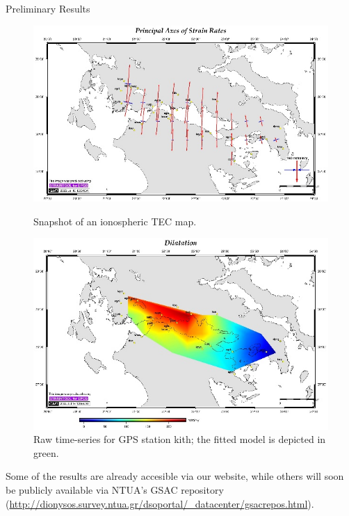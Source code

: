 \documentclass[final,a0,portrait]{beamer}
\newlength{\onecolwid}
\begin{document}
\begin{frame}[t]
\begin{columns}[t]
\begin{column}{\onecolwid}
\begin{block}{Preliminary Results}
{\begin{figure}
\centering
\begin{minipage}{.5\textwidth}
    \centering
    \includegraphics[width=1\linewidth]{gsg2022_str.jpg}
    \caption{Snapshot of an ionospheric TEC map.} %
    \label{fig:ion}
\end{minipage}%
\begin{minipage}{.5\textwidth}
    \centering
    \includegraphics[width=1\linewidth]{gsg2022_dil.jpg}
    \caption{Raw time-series for GPS station kith; the fitted model is depicted in green.}
    \label{fig:modts}
\end{minipage}
\end{figure}

Some of the results are already accesible via our website, while others will soon be publicly available via NTUA's GSAC 
\cite{gsac} repository (\url{http://dionysos.survey.ntua.gr/dsoportal/_datacenter/gsacrepos.html}).\\

}
\end{block}
\end{column}
\end{columns}
\end{frame}
\end{document}
